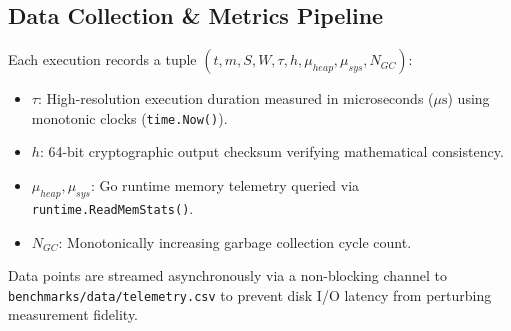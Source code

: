 \subsection{Data Collection & Metrics Pipeline}
Each execution records a tuple $(t, m, S, W, \tau, h, \mu_{heap}, \mu_{sys}, N_{GC})$:
\begin{itemize}
    \item $\tau$: High-resolution execution duration measured in microseconds ($\mu\text{s}$) using monotonic clocks (\texttt{time.Now()}).
    \item $h$: 64-bit cryptographic output checksum verifying mathematical consistency.
    \item $\mu_{heap}, \mu_{sys}$: Go runtime memory telemetry queried via \texttt{runtime.ReadMemStats()}.
    \item $N_{GC}$: Monotonically increasing garbage collection cycle count.
\end{itemize}
Data points are streamed asynchronously via a non-blocking channel to \texttt{benchmarks/data/telemetry.csv} to prevent disk I/O latency from perturbing measurement fidelity.
